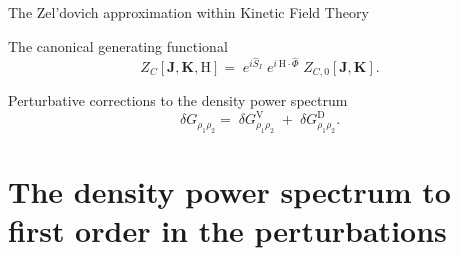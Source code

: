 \documentclass[10pt]{beamer}
\begin{document}
\begin{frame}[fragile]{The Zel'dovich approximation within Kinetic Field Theory}

\begin{block}{The canonical generating functional}
	\vspace{0.2cm}
\begin{equation}
	Z_C \left[\boldsymbol{J}, \boldsymbol{K}, \mathrm{H}\right]=\; e^{i \hat{S}_I}\; e^{i \,\mathrm{H} \cdot \hat{ \Phi}}\; Z_{C, 0} [\boldsymbol{J}, \boldsymbol{K}].	
\end{equation}

\end{block}
\vspace{1.4 cm}
\begin{block}{Perturbative corrections to the density power spectrum}
	\vspace{0.2 cm}
	\begin{equation}
		\delta G_{\rho_1 \rho_2} = \; \delta G^{ \mathrm{V}}_{\rho_1 \rho_2} \; + \; \delta G^{\mathrm{D}}_{\rho_1 \rho_2}.
	\end{equation}
\end{block}
\end{frame}
\section{The density power spectrum to first order in the perturbations}
\end{document}
